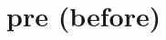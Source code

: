\chapter{pre (before)}

\begin{vocabulary}[precede]
\end{vocabulary}

\begin{vocabulary}[previous]
\end{vocabulary}